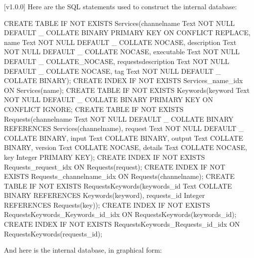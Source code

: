[v1.0.0]
Here are the SQL statements used to construct the internal database:
\outputBegin
\begin{listing}[5]{1}
CREATE TABLE IF NOT EXISTS Services(channelname Text NOT NULL DEFAULT _
           COLLATE BINARY PRIMARY KEY ON CONFLICT REPLACE,
       name Text NOT NULL DEFAULT _ COLLATE NOCASE,
       description Text NOT NULL DEFAULT _ COLLATE NOCASE,
       executable Text NOT NULL DEFAULT _ COLLATE_NOCASE,
       requestsdescription Text NOT NULL DEFAULT _ COLLATE NOCASE,
       tag Text NOT NULL DEFAULT _  COLLATE BINARY);
CREATE INDEX IF NOT EXISTS Services_name_idx ON Services(name);
CREATE TABLE IF NOT EXISTS Keywords(keyword Text NOT NULL DEFAULT _
           COLLATE BINARY PRIMARY KEY ON CONFLICT IGNORE;
CREATE TABLE IF NOT EXISTS Requests(channelname Text NOT NULL DEFAULT _
           COLLATE BINARY REFERENCES Services(channelname),
       request Text NOT NULL DEFAULT _ COLLATE BINARY,
       input Text COLLATE BINARY,
       output Text COLLATE BINARY,
       version Text COLLATE NOCASE,
       details Text COLLATE NOCASE,
       key Integer PRIMARY KEY);
CREATE INDEX IF NOT EXISTS Requests_request_idx ON Requests(request);
CREATE INDEX IF NOT EXISTS Requests_channelname_idx ON Requests(channelname);
CREATE TABLE IF NOT EXISTS RequestsKeywords(keywords_id Text COLLATE BINARY
           REFERENCES Keywords(keyword),
       requests_id Integer REFERENCES Requests(key));
CREATE INDEX IF NOT EXISTS RequestsKeywords_Keywords_id_idx ON
       RequestsKeywords(keywords_id);
CREATE INDEX IF NOT EXISTS RequestsKeywords_Requests_id_idx ON
       RequestsKeywords(requests_id);
\end{listing}
\outputEnd
\condPage{}
And here is the internal database, in graphical form:\\
\appendixEnd{}
